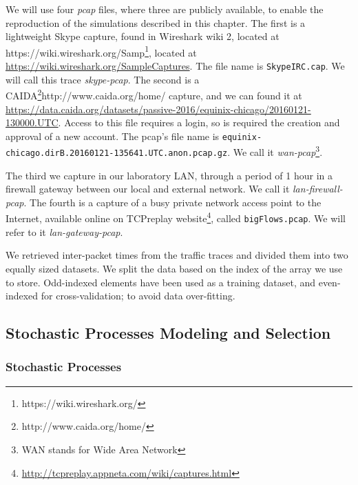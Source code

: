 We will use four \textit{pcap} files, where three are publicly available, to enable the reproduction of the simulations described in this chapter. The first is a lightweight Skype capture, found in Wireshark wiki 2, located at https://wiki.wireshark.org/Samp\footnote{https://wiki.wireshark.org/}, located  at \href{https://wiki.wireshark.org/SampleCaptures}{https://wiki.wireshark.org/SampleCaptures}. The file name is \texttt{SkypeIRC.cap}. We will call this trace \textit{skype-pcap}. The second is a CAIDA\footnote{http://www.caida.org/home/}{http://www.caida.org/home/} capture, and we can found it at \href{https://data.caida.org/datasets/passive-2016/equinix-chicago/20160121-130000.UTC}{https://data.caida.org/datasets/passive-2016/equinix-chicago/20160121-130000.UTC}. Access to this file requires a login, so is required the creation and approval of a new account.  The pcap's file name is \texttt{equinix-chicago.dirB.20160121-135641.UTC.anon.pcap.gz}. We call it \textit{wan-pcap}\footnote{\acrshort{WAN} stands for Wide Area Network}.

The third we capture in our laboratory \acrshort{LAN}, through a period of 1 hour in a firewall gateway between our local and external network. We call it \textit{lan-firewall-pcap}. The fourth is a capture of a busy private network access point to the Internet, available online on TCPreplay website\footnote{ \href{http://tcpreplay.appneta.com/wiki/captures.html}{http://tcpreplay.appneta.com/wiki/captures.html}}, called \texttt{bigFlows.pcap}. We will refer to it \textit{lan-gateway-pcap}.

We retrieved inter-packet times from the traffic traces and divided them into two equally sized datasets. We split the data based on the index of the array we use to store. Odd-indexed elements have been used as a training dataset, and even-indexed for cross-validation; to avoid data over-fitting.


\subsection{Stochastic Processes Modeling and Selection}


\subsubsection{Stochastic Processes}

